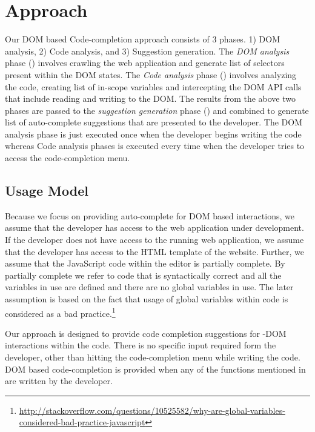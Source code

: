 \section{Approach}
\label{Sec:Approach}

	Our DOM based Code-completion approach consists of 3 phases. 1) DOM analysis, 2) Code analysis, and 3) Suggestion generation. The \emph{DOM analysis} phase () involves crawling the web application and generate list of \css selectors present within the DOM states. The \emph{Code analysis} phase () involves analyzing the \javascript code, creating list of in-scope variables and intercepting the DOM API calls that include reading and writing to the DOM. The results from the above two phases are passed to the \emph{suggestion generation} phase () and combined to generate list of auto-complete suggestions that are presented to the developer. The DOM analysis phase is just executed once when the developer begins writing the code whereas Code analysis phases is executed every time when the developer tries to access the code-completion menu.
	
	\subsection{Usage Model}
	\label{Sec:Model}
		Because we focus on providing auto-complete for DOM based interactions, we assume that the developer has access to the web application under development. If the developer does not have access to the running web application, we assume that the developer has access to the HTML template of the website. Further, we assume that the JavaScript code within the editor is partially complete. By partially complete we refer to \javascript code that is syntactically correct and all the variables in use are defined and there are no global variables in use. The later assumption is based on the fact that usage of global variables within \javascript code is considered as a bad practice.\footnote{\url{http://stackoverflow.com/questions/10525582/why-are-global-variables-considered-bad-practice-javascript}}
		
		Our approach is designed to provide code completion suggestions for \javascript-DOM interactions within the \javascript code. There is no specific input required form the developer, other than hitting the code-completion menu while writing the code. DOM based code-completion is provided when any of the  functions mentioned in  are written by the developer.
	
